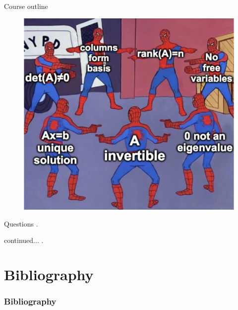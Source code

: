 \documentclass[11pt]{beamer}
\theoremstyle{plain}
\begin{document}
\begin{frame}{Course outline}
\begin{figure}[H]
\centering
\includegraphics[scale=0.2]{outline.png}
\end{figure}
\end{frame}
\begin{frame}{Questions}
    .
\end{frame}
\begin{frame}{continued...}
    .
\end{frame}

\section{Bibliography}
\begin{frame}[t,allowframebreaks]
\frametitle{Bibliography}
\printbibliography[heading=none]
\end{frame}
\end{document}
